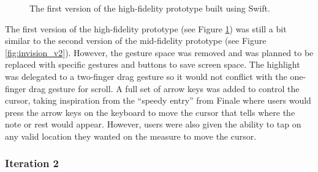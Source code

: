 				\begin{figure}[H]
					\centering
				    \caption{The first version of the high-fidelity prototype built using Swift.}
				    \label{fig:flow_it1}
				\end{figure} 


				The first version of the high-fidelity prototype (see Figure \ref{fig:flow_it1}) was still a bit similar to the second version of the mid-fidelity prototype (see Figure \ref{fig:invision_v2}). However, the gesture space was removed and was planned to be replaced with specific gestures and buttons to save screen space. The highlight was delegated to a two-finger drag gesture so it would not conflict with the one-finger drag gesture for scroll. A full set of arrow keys was added to control the cursor, taking inspiration from the ``speedy entry'' from Finale where users would press the arrow keys on the keyboard to move the cursor that tells where the note or rest would appear. However, users were also given the ability to tap on any valid location they wanted on the measure to move the cursor. 

			\subsubsection{Iteration 2}

